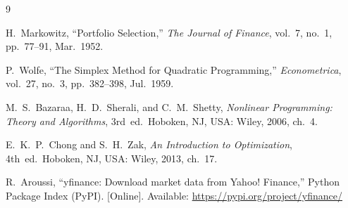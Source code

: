 \documentclass[conference]{IEEEtran}
\begin{document}
\begin{thebibliography}{9}

H.~Markowitz,
``Portfolio Selection,''
\textit{The Journal of Finance},
vol.~7, no.~1, pp.~77--91, Mar.\ 1952.

P.~Wolfe,
``The Simplex Method for Quadratic Programming,''
\textit{Econometrica},
vol.~27, no.~3, pp.~382--398, Jul.\ 1959.

M.~S.~Bazaraa, H.~D.~Sherali, and C.~M.~Shetty,
\textit{Nonlinear Programming: Theory and Algorithms},
3rd~ed.\ Hoboken, NJ, USA: Wiley, 2006, ch.~4.

E.~K.~P.~Chong and S.~H.~Zak,
\textit{An Introduction to Optimization},
4th~ed.\ Hoboken, NJ, USA: Wiley, 2013, ch.~17.

R.~Aroussi,
``yfinance: Download market data from Yahoo! Finance,''
Python Package Index (PyPI).
[Online]. Available: \url{https://pypi.org/project/yfinance/}

\end{thebibliography}
\end{document}
